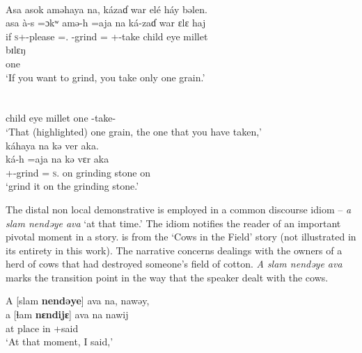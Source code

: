 \ea \label{ex:3:62}\\
Asa  asok aməhaya  na,  kázaɗ   war  elé  háy  bəlen.\\
\gll  asa  à-s            =ɔkʷ  amə-h       =aja        na   ká-zaɗ              war     ɛlɛ      haj   \\
      if \textsc{s}+{\PFV}-please ={\twoS}.{\IO} {\DEP}-grind ={\PLU} {\PSP} {\twoS}+{\IFV}-take  child  eye  millet \\
      
      \medskip
\gll bɪlɛŋ\\
     one\\
\glt  ‘If you want to grind, you take only one grain.’\\
\\
\\
     child eye millet  one   {\ADJ}   {\DEM}        {\twoS}                {\DEP}-take-{\CL}   {\PSP}\\
\glt ‘That (highlighted) one grain, the one that you have taken,’\\
\medskip
káhaya  na  kə  ver  aka.\\
\gll ká-h    =aja     na       kə       vɛr        aka\\
{\twoS}+{\IFV}-grind ={\PLU}  \textsc{s}.{\DO}  on   {grinding stone}  on\\
\glt ‘grind it on the grinding stone.’
\z

The distal non local demonstrative is employed in a common discourse idiom  -- \textit{a slam nendəye ava} ‘at that time.’ The idiom notifies the reader of an important pivotal moment in a story.  is from the ‘Cows in the Field’ story (not illustrated in its entirety in this work). The narrative concerns dealings with the owners of a herd of cows that had destroyed someone’s field of cotton. \textit{A slam nendəye ava} marks the transition point in the way that the speaker dealt with the cows. 


\ea \label{ex:3:63}
A  [slam  \textbf{nendəye}]  ava  na,  nawəy,\\
\gll  a   [ɬam   \textbf{nɛndijɛ}]   ava   na    nawij\\
      at  place      {\DEM}          in   {\PSP}   {\oneS}+said\\
\glt ‘At that moment, I said,’\\
      
